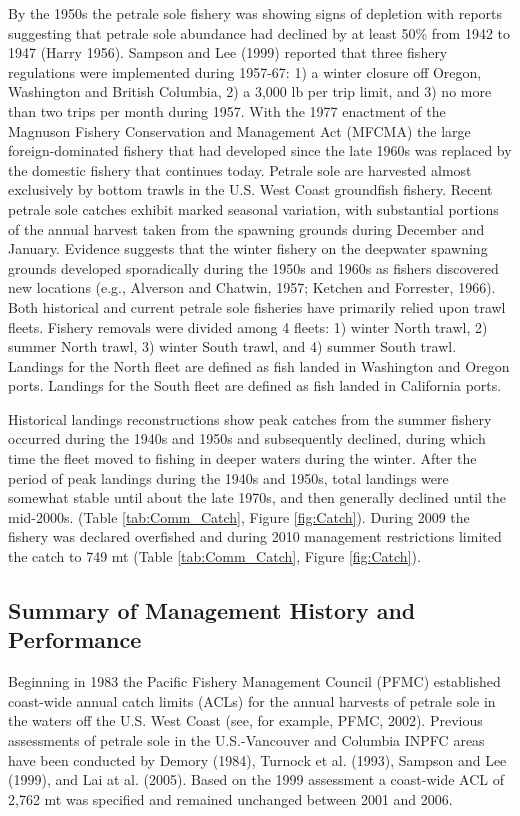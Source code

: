 \documentclass[12pt,]{article}
\begin{document}
By the 1950s the petrale sole fishery was showing signs of depletion
with reports suggesting that petrale sole abundance had declined by at
least 50\% from 1942 to 1947 (Harry 1956). Sampson and Lee (1999)
reported that three fishery regulations were implemented during 1957-67:
1) a winter closure off Oregon, Washington and British Columbia, 2) a
3,000 lb per trip limit, and 3) no more than two trips per month during
1957. With the 1977 enactment of the Magnuson Fishery Conservation and
Management Act (MFCMA) the large foreign-dominated fishery that had
developed since the late 1960s was replaced by the domestic fishery that
continues today. Petrale sole are harvested almost exclusively by bottom
trawls in the U.S. West Coast groundfish fishery. Recent petrale sole
catches exhibit marked seasonal variation, with substantial portions of
the annual harvest taken from the spawning grounds during December and
January. Evidence suggests that the winter fishery on the deepwater
spawning grounds developed sporadically during the 1950s and 1960s as
fishers discovered new locations (e.g., Alverson and Chatwin, 1957;
Ketchen and Forrester, 1966). Both historical and current petrale sole
fisheries have primarily relied upon trawl fleets. Fishery removals were
divided among 4 fleets: 1) winter North trawl, 2) summer North trawl, 3)
winter South trawl, and 4) summer South trawl. Landings for the North
fleet are defined as fish landed in Washington and Oregon ports.
Landings for the South fleet are defined as fish landed in California
ports.

Historical landings reconstructions show peak catches from the summer
fishery occurred during the 1940s and 1950s and subsequently declined,
during which time the fleet moved to fishing in deeper waters during the
winter. After the period of peak landings during the 1940s and 1950s,
total landings were somewhat stable until about the late 1970s, and then
generally declined until the mid-2000s. (Table \ref{tab:Comm_Catch},
Figure \ref{fig:Catch}). During 2009 the fishery was declared overfished
and during 2010 management restrictions limited the catch to 749 mt
(Table \ref{tab:Comm_Catch}, Figure \ref{fig:Catch}).

\subsection{Summary of Management History and
Performance}\label{summary-of-management-history-and-performance}

Beginning in 1983 the Pacific Fishery Management Council (PFMC)
established coast-wide annual catch limits (ACLs) for the annual
harvests of petrale sole in the waters off the U.S. West Coast (see, for
example, PFMC, 2002). Previous assessments of petrale sole in the
U.S.-Vancouver and Columbia INPFC areas have been conducted by Demory
(1984), Turnock et al. (1993), Sampson and Lee (1999), and Lai at al.
(2005). Based on the 1999 assessment a coast-wide ACL of 2,762 mt was
specified and remained unchanged between 2001 and 2006.
\end{document}
